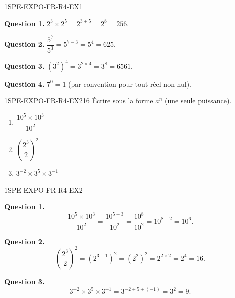 

\begin{corrige}{1SPE-EXPO-FR-R4-EX1}

\textbf{Question 1.} $2^3 \times 2^5 = 2^{3+5} = 2^8 = 256$.

\textbf{Question 2.} $\dfrac{5^7}{5^3} = 5^{7-3} = 5^4 = 625$.

\textbf{Question 3.} $(3^2)^4 = 3^{2 \times 4} = 3^8 = 6561$.

\textbf{Question 4.} $7^0 = 1$ (par convention pour tout réel non nul).

\end{corrige}


\begin{exercice}{1SPE-EXPO-FR-R4-EX2}{1}{6}
Écrire sous la forme $a^n$ (une seule puissance).
\begin{enumerate}
  \item $\dfrac{10^5 \times 10^3}{10^2}$
  \item $\left(\dfrac{2^3}{2}\right)^2$
  \item $3^{-2} \times 3^5 \times 3^{-1}$
\end{enumerate}
\end{exercice}



\begin{corrige}{1SPE-EXPO-FR-R4-EX2}

\textbf{Question 1.}
\[
\frac{10^5 \times 10^3}{10^2} = \frac{10^{5+3}}{10^2} = \frac{10^8}{10^2} = 10^{8-2} = 10^6.
\]

\textbf{Question 2.}
\[
\left(\frac{2^3}{2}\right)^2 = \left(2^{3-1}\right)^2 = (2^2)^2 = 2^{2 \times 2} = 2^4 = 16.
\]

\textbf{Question 3.}
\[
3^{-2} \times 3^5 \times 3^{-1} = 3^{-2+5+(-1)} = 3^{2} = 9.
\]

\end{corrige}

